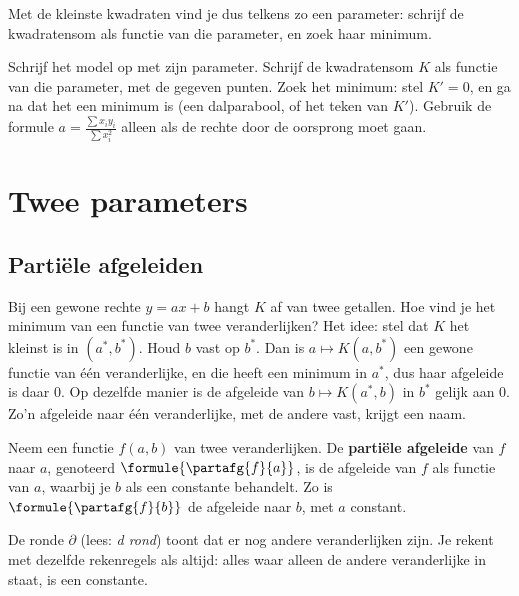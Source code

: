 Met de kleinste kwadraten vind je dus telkens zo een parameter: schrijf de kwadratensom als functie van die parameter, en zoek haar minimum.

\begin{werkwijze}
Schrijf het model op met zijn parameter. Schrijf de kwadratensom $K$ als functie van die parameter, met de gegeven punten. Zoek het minimum: stel $K' = 0$, en ga na dat het een minimum is (een dalparabool, of het teken van $K'$). Gebruik de formule $a = \frac{\sum x_i y_i}{\sum x_i^2}$ alleen als de rechte door de oorsprong moet gaan.
\end{werkwijze}

\begin{oefeningen}

\end{oefeningen}

\section{Twee parameters}

\subsection{Partiële afgeleiden}

Bij een gewone rechte $y = ax + b$ hangt $K$ af van twee getallen. Hoe vind je het minimum van een functie van twee veranderlijken? Het idee: stel dat $K$ het kleinst is in $(a^*, b^*)$. Houd $b$ vast op $b^*$. Dan is $a \mapsto K(a, b^*)$ een gewone functie van één veranderlijke, en die heeft een minimum in $a^*$, dus haar afgeleide is daar 0. Op dezelfde manier is de afgeleide van $b \mapsto K(a^*, b)$ in $b^*$ gelijk aan 0. Zo'n afgeleide naar één veranderlijke, met de andere vast, krijgt een naam.

\begin{theorie}
Neem een functie $f(a, b)$ van twee veranderlijken. De \textbf{\textcolor{accent}{partiële afgeleide}} van $f$ naar $a$, genoteerd $\formule{\partafg{f}{a}}$, is de afgeleide van $f$ als functie van $a$, waarbij je $b$ als een constante behandelt. Zo is $\formule{\partafg{f}{b}}$ de afgeleide naar $b$, met $a$ constant.
\end{theorie}

De ronde $\partial$ (lees: \textit{d rond}) toont dat er nog andere veranderlijken zijn. Je rekent met dezelfde rekenregels als altijd: alles waar alleen de andere veranderlijke in staat, is een constante.

